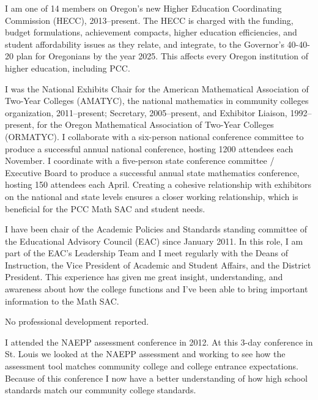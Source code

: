 \begin{description}[style=nextline]
	\item[Frank Goulard (Part-time Instructor, Sylvania Campus)]
	I am one of 14 members on Oregon's new Higher Education Coordinating
	Commission (HECC), 2013--present.  The HECC is charged with the funding, budget
	formulations, achievement compacts, higher education efficiencies, and student
	affordability issues as they relate, and integrate, to the Governor's
	40-40-20 plan for Oregonians by the year 2025. This affects every Oregon
	institution of higher education, including PCC.

	I was the National Exhibits Chair for the American Mathematical Association of
	Two-Year Colleges (AMATYC), the national mathematics in community colleges
	organization, 2011--present; Secretary, 2005--present, and Exhibitor Liaison,
	1992--present, for the Oregon Mathematical Association of Two-Year Colleges
	(ORMATYC). I collaborate with a six-person national conference committee to
	produce a successful annual national conference, hosting 1200 attendees each
	November. I coordinate with a five-person state conference committee /
	Executive Board to produce a successful annual state mathematics conference,
	hosting 150 attendees each April. Creating a cohesive relationship with
	exhibitors on the national and state levels ensures a closer working
	relationship, which is beneficial for the PCC Math SAC and student needs.

	\item[Peter Haberman (Full-time Instructor, Sylvania Campus)]
	I have been chair of the Academic Policies and Standards standing committee of
	the Educational Advisory Council (EAC) since January 2011.  In this role, I am
	part of the EAC's Leadership Team and I meet regularly with the Deans of
	Instruction, the Vice President of Academic and Student Affairs, and the
	District President.  This experience has given me great insight, understanding,
	and awareness about how the college functions and I've been able to bring
	important information to the Math SAC.

	\item[Dave Hall (Full-time Instructor, Rock Creek Campus)]
	No professional development reported.
	\item[Shane Horner (Full-Time instructor, Cascade campus)]
	I attended the NAEPP assessment conference in 2012.  At this 3-day conference
	in St. Louis we looked at the NAEPP assessment and working to see how the
	assessment tool matches community college and college entrance expectations.
	Because of this conference I now have a better understanding of how high school
	standards match our community college standards.


\end{description}
